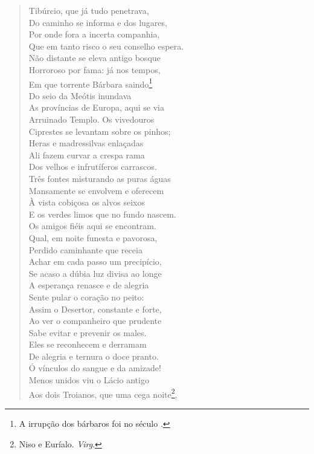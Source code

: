 \begin{verse}
Tibúrcio, que já tudo penetrava,\\
Do caminho se informa e dos lugares,\\
Por onde fora a incerta companhia,\\
Que em tanto risco o seu conselho espera. \\[10pt]


Não distante se eleva antigo bosque\\
Horroroso por fama: já nos tempos,\\
Em que torrente Bárbara saindo\footnote{ A irrupção dos bárbaros foi no século .}\\
Do seio da Meótis inundava\\                   %
As províncias de Europa, aqui se via\\
Arruinado Templo. Os vivedouros\\
Ciprestes se levantam sobre os pinhos;\\
Heras e madressilvas enlaçadas\\
Ali fazem curvar a crespa rama\\
Dos velhos e infrutíferos carrascos.\\
Três fontes misturando as puras águas\\
Mansamente se envolvem e oferecem\\
À vista cobiçosa os alvos seixos\\
E os verdes limos que no fundo nascem.\\
Os amigos fiéis aqui se encontram.\\
Qual, em noite funesta e pavorosa,\\
Perdido caminhante que receia\\
Achar em cada passo um precipício,\\
Se acaso a dúbia luz divisa ao longe\\
A esperança renasce e de alegria\\
Sente pular o coração no peito:\\
Assim o Desertor, constante e forte,\\
Ao ver o companheiro que prudente\\
Sabe evitar e prevenir os males.\\
Eles se reconhecem e derramam\\
De alegria e ternura o doce pranto.\\
Ó vínculos do sangue e da amizade!\\
Menos unidos viu o Lácio antigo\\
Aos dois Troianos, que uma cega noite\footnote{ Niso e Euríalo. \textit{Virg}.},\\		\index{\Niso}

\end{verse}
